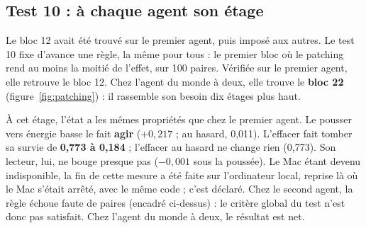 \documentclass[fontsize=10pt,paper=a4,parskip=half-]{scrartcl}
\newcommand{\q}[1]{\og #1\fg{}}
\begin{document}
\subsection{Test 10 : à chaque agent son étage}
Le bloc 12 avait été trouvé sur le premier agent, puis imposé aux autres. Le test 10 fixe
d'avance une règle, la même pour tous : le premier bloc où le patching rend au moins la
moitié de l'effet, sur 100 paires. Vérifiée sur le premier agent, elle retrouve le bloc
12. Chez l'agent du monde à deux, elle trouve le \textbf{bloc 22}
(figure~\ref{fig:patching}) : il rassemble son besoin dix étages plus haut.

À cet étage, l'état a les mêmes propriétés que chez le premier agent. Le pousser vers
\q{énergie basse} le fait \textbf{agir} ($+0,217$ ; au hasard, 0,011). L'effacer fait
tomber sa survie de \textbf{0,773 à 0,184} ; l'effacer au hasard ne change rien (0,773).
Son lecteur, lui, ne bouge presque pas ($-0,001$ sous la poussée). Le Mac étant devenu
indisponible, la fin de cette mesure a été faite sur l'ordinateur local, reprise là où le
Mac s'était arrêté, avec le même code ; c'est déclaré. Chez le second agent, la règle
échoue faute de paires (encadré ci-dessus) : le critère global du test n'est donc pas
satisfait. Chez l'agent du monde à deux, le résultat est net.
\end{document}
